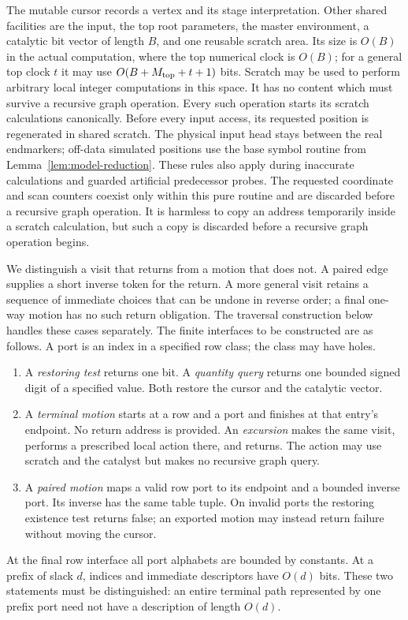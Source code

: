 The mutable cursor records a vertex and its stage interpretation.  Other shared facilities are the input, the top root parameters, the master
environment, a catalytic bit vector of length $B$, and one reusable
scratch area.  Its size is $O(B)$ in the actual computation, where the
top numerical clock is $O(B)$; for a general top clock $t$ it may use
$O(B+M_{\rm top}+t+1)$ bits.  Scratch may be used to perform arbitrary local integer
computations in this space.  It has no content which must survive a
recursive graph operation.  Every such operation starts its scratch
calculations canonically. Before every input access, its requested
position is regenerated in shared scratch. The physical
input head stays between the real endmarkers; off-data simulated
positions use the base symbol routine from
Lemma~\ref{lem:model-reduction}. These rules also apply during inaccurate
calculations and guarded artificial predecessor probes. The requested
coordinate and scan counters coexist only within this pure routine and
are discarded before a recursive graph operation. It is harmless to
copy an address temporarily
inside a scratch calculation, but such a copy is discarded before a
recursive graph operation begins.

We distinguish a visit that returns from a motion that does not. A paired edge supplies a short inverse token for the return. A more general visit retains a sequence of immediate choices that can be undone in reverse order; a final one-way motion has no such return obligation. The traversal construction below handles these cases separately. The finite interfaces to be constructed are as follows.  A port is an
index in a specified row class; the class may have holes.
\begin{enumerate}
\item A \emph{restoring test} returns one bit.  A \emph{quantity query}
  returns one bounded signed digit of a specified value.  Both restore
  the cursor and the catalytic vector.
\item A \emph{terminal motion} starts at a row and a port and finishes at
  that entry's endpoint.  No return address is provided.  An
  \emph{excursion} makes the same visit, performs a prescribed local
  action there, and returns.  The action may use scratch and the catalyst
  but makes no recursive graph query.
\item A \emph{paired motion} maps a valid row port to its endpoint and a
  bounded inverse port.  Its inverse has the same table tuple.  On
  invalid ports the restoring existence test returns false; an exported
  motion may instead return failure without moving the cursor.
\end{enumerate}
At the final row interface all port alphabets are bounded by constants.
At a prefix of slack $d$, indices and immediate descriptors have $O(d)$
bits.  These two statements must be distinguished: an entire terminal
path represented by one prefix port need not have a description of
length $O(d)$.

